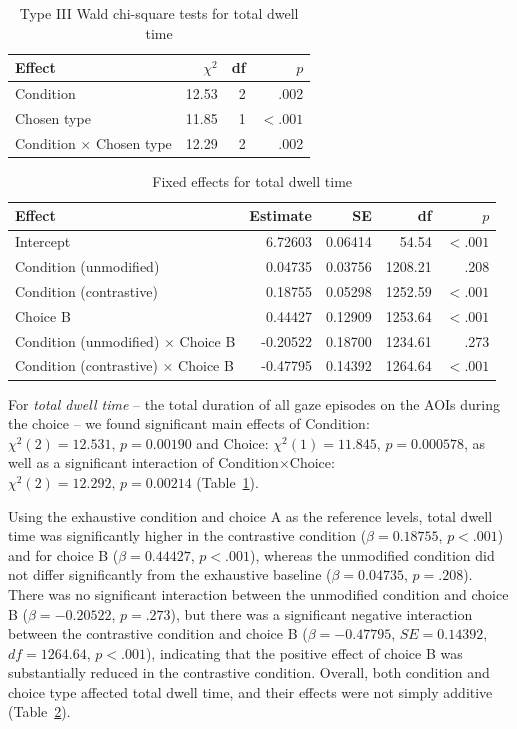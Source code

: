 \documentclass[a4paper, ruler]{CUP-JNL-LIN}%
\begin{document}
\begin{table}[htbp]
\centering
\caption{Type III Wald chi-square tests for total dwell time}
\label{tab:total-dwell}
\begin{tabularx}{\textwidth}{@{}Xrrr@{}}
\toprule
Effect & $\chi^2$ & df & $p$ \\
\midrule
Condition & 12.53 & 2 & .002 \\
Chosen type & 11.85 & 1 & $< .001$ \\
Condition $\times$ Chosen type & 12.29 & 2 & .002 \\
\bottomrule
\end{tabularx}
\end{table}

\begin{table}[htbp]
\centering
\caption{Fixed effects for total dwell time}
\label{tab:total-dwell-fixed}
\begin{tabularx}{\textwidth}{@{}Xrrrr@{}}
\toprule
Effect & Estimate & SE & df & $p$ \\
\midrule
Intercept & 6.72603 & 0.06414 & 54.54 & $< .001$ \\
Condition (unmodified) & 0.04735 & 0.03756 & 1208.21 & .208 \\
Condition (contrastive) & 0.18755 & 0.05298 & 1252.59 & $< .001$ \\
Choice B & 0.44427 & 0.12909 & 1253.64 & $< .001$ \\
Condition (unmodified) $\times$ Choice B & -0.20522 & 0.18700 & 1234.61 & .273 \\
Condition (contrastive) $\times$ Choice B & -0.47795 & 0.14392 & 1264.64 & $< .001$ \\
\bottomrule
\end{tabularx}
\end{table}

For \textit{total dwell time} -- the total duration of all gaze episodes on the AOIs during the choice -- we found significant main effects of Condition: \(\chi^2(2)=12.531,\,p=0.00190\) and Choice: \(\chi^2(1)=11.845,\,p=0.000578\), as well as a significant interaction of Condition\(\times\)Choice: \(\chi^2(2)=12.292,\,p=0.00214\) (Table~\ref{tab:total-dwell}). 

Using the exhaustive condition and choice A as the reference levels, total dwell time was significantly higher in the contrastive condition ($\beta = 0.18755$, $p < .001$) and for choice B ($\beta = 0.44427$, $p < .001$), whereas the unmodified condition did not differ significantly from the exhaustive baseline ($\beta = 0.04735$, $p = .208$). There was no significant interaction between the unmodified condition and choice B ($\beta = -0.20522$, $p = .273$), but there was a significant negative interaction between the contrastive condition and choice B ($\beta = -0.47795$, $SE = 0.14392$, $df = 1264.64$, $p < .001$), indicating that the positive effect of choice B was substantially reduced in the contrastive condition. Overall, both condition and choice type affected total dwell time, and their effects were not simply additive (Table~\ref{tab:total-dwell-fixed}).
\end{document}
